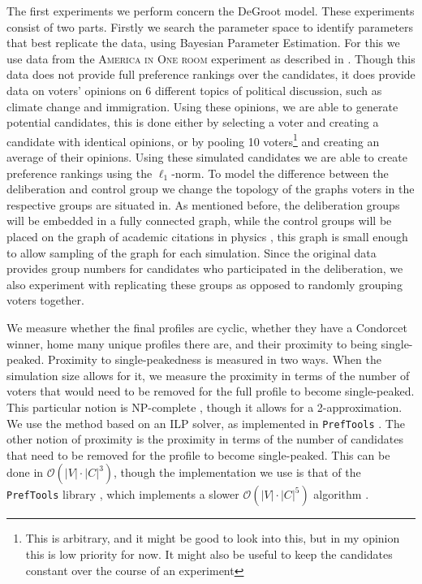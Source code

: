 The first experiments we perform concern the DeGroot model. These experiments
consist of two parts. Firstly we search the parameter space to identify
parameters that best replicate the data, using Bayesian Parameter Estimation.
For this we use data from the \textsc{America in One room} experiment as
described in . Though this data does not provide
full preference rankings over the candidates, it does provide data on voters'
opinions on 6 different topics of political discussion, such as climate change
and immigration. Using these opinions, we are able to generate potential
candidates, this is done either by selecting a voter and creating a candidate
with identical opinions, or by pooling 10 voters\footnote{This is arbitrary,
	and it might be good to look into this, but in my opinion this is low priority
	for now. It might also be useful to keep the candidates constant over the
	course of an experiment}
and creating an average of their opinions. Using these
simulated candidates we are able to create preference rankings using the
$\ell_1$-norm. To model the difference between the deliberation and control
group we change the topology of the graphs voters in the respective groups are
situated in. As mentioned before, the deliberation groups will be embedded in a fully connected
graph, while the control groups will be placed on the graph of academic
citations in physics \cite{nr}, this graph is small enough to
allow sampling of the graph for each simulation. Since the original data
provides group numbers for candidates who participated in the deliberation, we
also experiment with replicating these groups as opposed to randomly grouping
voters together.


We measure whether the final profiles are cyclic, whether they have a Condorcet
winner, home many unique profiles there are, and their proximity to being
single-peaked. Proximity to single-peakedness is measured in two ways. When the
simulation size allows for it, we measure the proximity in terms of the number
of voters that would need to be removed for the full profile to become
single-peaked. This particular notion is NP-complete
\cite{erdelyiComputationalAspectsNearly2013}, though it allows for a
2-approximation. We use the method based on an ILP solver, as implemented in
\texttt{PrefTools} \cite{PrefLibPreflibtools2025}. The other notion of proximity is the proximity in
terms of the number of candidates that need to be removed for the profile to
become single-peaked. This can be done in $\mathcal{O}(|V| \cdot{} |C|
	^3)$\cite{przedmojskiAlgorithmsExperimentsNearly}, though the implementation we
use is that of the \texttt{PrefTools} library \cite{PrefLibPreflibtools2025}, which implements
a slower $\mathcal{O}(|V| \cdot{} |C|^5)$ algorithm
\cite{erdelyiComputationalAspectsNearly2013}.




